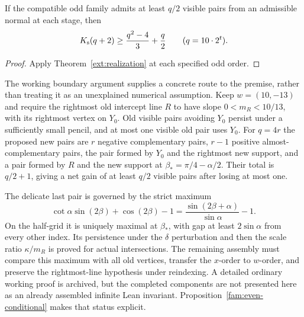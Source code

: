 \begin{proposition}
\label{fam:even-conditional}
If the compatible odd family admits at least $q/2$ visible pairs from
an admissible normal at each stage, then
\[
 K_{\mathrm{s}}(q+2)\geq\frac{q^2-4}{3}+\frac q2
 \qquad(q=10\cdot2^t).
\]
\end{proposition}

\begin{proof}
Apply Theorem~\ref{ext:realization} at each specified odd order.
\end{proof}

The working boundary argument supplies a concrete route to the premise,
rather than treating it as an unexplained numerical assumption.  Keep
$w=(10,-13)$ and require the rightmost old intercept line $R$ to have
slope $0<m_R<10/13$, with its rightmost vertex on $Y_0$.  Old visible
pairs avoiding $Y_0$ persist under a sufficiently small pencil, and at
most one visible old pair uses $Y_0$.  For $q=4r$ the proposed new pairs
are $r$ negative complementary pairs, $r-1$ positive almost-complementary
pairs, the pair formed by $Y_0$ and the rightmost new support, and a pair
formed by $R$ and the new support at
$\beta_* =\pi/4-\alpha/2$.  Their total is $q/2+1$, giving a net gain
of at least $q/2$ visible pairs after losing at most one.

The delicate last pair is governed by the strict maximum
\[
 \cot\alpha\sin(2\beta)+\cos(2\beta)-1
 =\frac{\sin(2\beta+\alpha)}{\sin\alpha}-1.
\]
On the half-grid it is uniquely maximal at $\beta_*$, with gap at least
$2\sin\alpha$ from every other index.  Its persistence under the
$\delta$ perturbation and then the scale ratio $\kappa/m_R$ is proved
for actual intersections.  The remaining assembly must compare this
maximum with all old vertices, transfer the $x$-order to $w$-order, and
preserve the rightmost-line hypothesis under reindexing.  A detailed
ordinary working proof is archived, but the completed components are
not presented here as an already assembled infinite Lean invariant.
Proposition~\ref{fam:even-conditional} makes that status explicit.

